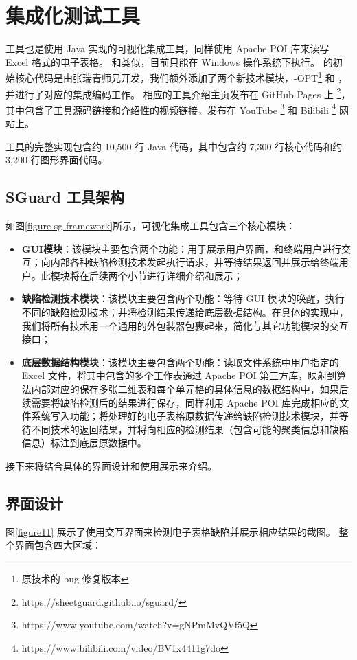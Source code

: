 \section{集成化测试工具 \sg }
\sg 工具也是使用 Java 实现的可视化集成工具，同样使用 Apache POI 库来读写 Excel 格式的电子表格。
和\wa 类似，目前只能在 Windows 操作系统下执行。
\sg 的初始核心代码是由张瑞青师兄开发，我们额外添加了两个新技术模块，\cu-OPT\footnote{原\cu 技术的 bug 修复版本} 和 \wa ，并进行了对应的集成编码工作。
相应的工具介绍主页发布在 GitHub Pages 上 \footnote{https://sheetguard.github.io/sguard/}，其中包含了工具源码链接和介绍性的视频链接，发布在 YouTube \footnote{https://www.youtube.com/watch?v=gNPmMvQVf5Q} 和 Bilibili \footnote{https://www.bilibili.com/video/BV1x4411g7do} 网站上。

\sg 工具的完整实现包含约 10,500 行 Java 代码，其中包含约 7,300 行核心代码和约 3,200 行图形界面代码。

\subsection{SGuard 工具架构}

如图\ref{figure-sg-framework}所示，可视化集成工具\sg 包含三个核心模块：
\begin{itemize}
    \item \textbf{GUI模块}：该模块主要包含两个功能：用于展示用户界面，和终端用户进行交互；向内部各种缺陷检测技术发起执行请求，并等待结果返回并展示给终端用户。此模块将在后续两个小节进行详细介绍和展示；
    \item \textbf{缺陷检测技术模块}：该模块主要包含两个功能：等待 GUI 模块的唤醒，执行不同的缺陷检测技术；并将检测结果传递给底层数据结构。在具体的实现中，我们将所有技术用一个通用的外包装器包裹起来，简化与其它功能模块的交互接口；
    \item \textbf{底层数据结构模块}：该模块主要包含两个功能：读取文件系统中用户指定的 Excel 文件，将其中包含的多个工作表通过 Apache POI 第三方库，映射到算法内部对应的保存多张二维表和每个单元格的具体信息的数据结构中，如果后续需要将缺陷检测后的结果进行保存，同样利用 Apache POI 库完成相应的文件系统写入功能；将处理好的电子表格原数据传递给缺陷检测技术模块，并等待不同技术的返回结果，并将向相应的检测结果（包含可能的聚类信息和缺陷信息）标注到底层原数据中。
\end{itemize} 

接下来将结合具体的界面设计和使用展示来介绍\sg 。

\subsection{界面设计}

% 



% 
图\ref{figure11} 展示了\sg 使用交互界面来检测电子表格缺陷并展示相应结果的截图。
整个界面包含四大区域：

